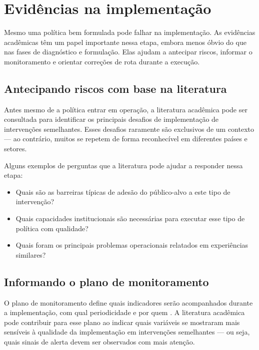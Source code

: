 \documentclass[12pt, a4paper, openany]{book}
\begin{document}
\chapter{Evidências na implementação}\label{cap5}

Mesmo uma política bem formulada pode falhar na implementação. As evidências
acadêmicas têm um papel importante nessa etapa, embora menos óbvio do que
nas fases de diagnóstico e formulação. Elas ajudam a antecipar riscos,
informar o monitoramento e orientar correções de rota durante a execução.

\section{Antecipando riscos com base na literatura}

Antes mesmo de a política entrar em operação, a literatura acadêmica pode ser
consultada para identificar os principais desafios de implementação de
intervenções semelhantes. Esses desafios raramente são exclusivos de um
contexto --- ao contrário, muitos se repetem de forma reconhecível em
diferentes países e setores.

Alguns exemplos de perguntas que a literatura pode ajudar a responder nessa
etapa:

\begin{itemize}[leftmargin=*]
  \item Quais são as barreiras típicas de adesão do público-alvo a este tipo
    de intervenção?
  \item Quais capacidades institucionais são necessárias para executar esse
    tipo de política com qualidade?
  \item Quais foram os principais problemas operacionais relatados em
    experiências similares?
\end{itemize}

\section{Informando o plano de monitoramento}

O plano de monitoramento define quais indicadores serão acompanhados durante
a implementação, com qual periodicidade e por quem \citep{Lima2025}. A
literatura acadêmica pode contribuir para esse plano ao indicar quais
variáveis se mostraram mais sensíveis à qualidade da implementação em
intervenções semelhantes --- ou seja, quais sinais de alerta devem ser
observados com mais atenção.
\end{document}
